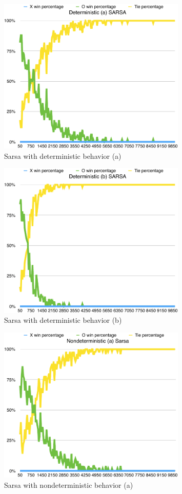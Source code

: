 \documentclass{journal}
\begin{document}
\begin{figure}[h]
	\includegraphics[width=0.8\textwidth]{SarsaD(a).pdf}
	\caption{Sarsa with deterministic behavior (a)}\label{fig:SDA}
\end{figure}
\begin{figure}[h]
	\includegraphics[width=0.8\textwidth]{SarsaD(b).pdf}
	\caption{Sarsa with deterministic behavior (b)}\label{fig:SDB}
\end{figure}
\begin{figure}[h]
	\includegraphics[width=0.8\textwidth]{SarsaN(a).pdf}
	\caption{Sarsa with nondeterministic behavior (a)}\label{fig:SNA}
\end{figure}
\end{document}
